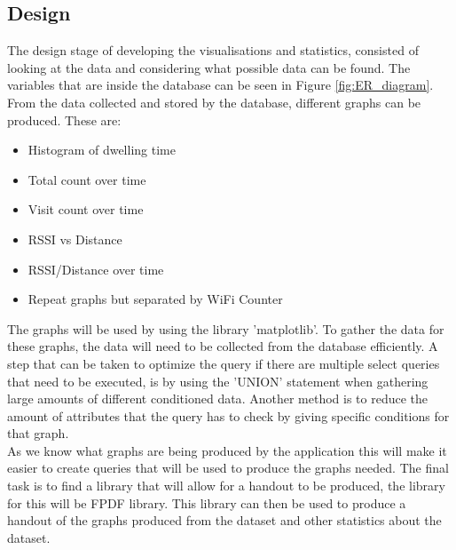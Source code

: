 \documentclass{report}
\begin{document}
\subsection{Design}
The design stage of developing the visualisations and statistics, consisted of looking at the data and considering what possible data can be found. The variables that are inside the database can be seen in Figure \ref{fig:ER_diagram}. From the data collected and stored by the database, different graphs can be produced. These are: 
\begin{itemize}
    \item Histogram of dwelling time
    \item Total count over time
    \item Visit count over time
    \item RSSI vs Distance
    \item RSSI/Distance over time
    \item Repeat graphs but separated by WiFi Counter
\end{itemize}
The graphs will be used by using the library 'matplotlib'\cite{matplotlib}. To gather the data for these graphs, the data will need to be collected from the database efficiently. A step that can be taken to optimize the query if there are multiple select queries that need to be executed, is by using the 'UNION' statement when gathering large amounts of different conditioned  data\cite{selecctOpt}.  Another method is to reduce the amount of attributes that the query has to check by giving specific conditions for that graph. \\ \newline
As we know what graphs are being produced by the application this will make it easier to create queries that will be used to produce the graphs needed. The final task is to find a library that will allow for a handout to be produced, the library for this will be FPDF library\cite{FPDF}. This library can then be used to produce a handout of the graphs produced from the dataset and other statistics about the dataset.  
\clearpage
\end{document}
